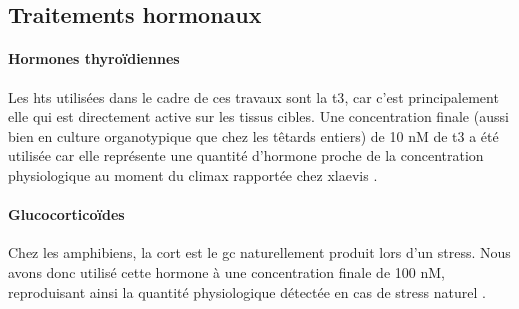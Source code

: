 \documentclass[../main.tex]{subfiles}
\begin{document}

\subsection{Traitements hormonaux}

\paragraph{Hormones thyroïdiennes}
Les \glspl{ht} utilisées dans le cadre de ces travaux sont la \gls{t3}, car c'est principalement elle qui est directement active sur les tissus cibles.
Une concentration finale (aussi bien en culture organotypique que chez les têtards entiers) de 10 nM de \gls{t3} a été utilisée car elle représente une quantité d'hormone proche de la concentration physiologique au moment du climax rapportée chez \gls{xlaevis} \citep{Leloup1977}.

\paragraph{Glucocorticoïdes}
Chez les amphibiens, la \gls{cort} est le \gls{gc} naturellement produit lors d'un stress.
Nous avons donc utilisé cette hormone à une concentration finale de 100 nM, reproduisant ainsi la quantité physiologique détectée en cas de stress naturel \citep{JolivetJaudet1984,Krain2004}.
\end{document}
